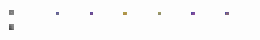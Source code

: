 \begin{figure}[h!]
	\setlength\tabcolsep{1pt}
	\def\arraystretch{0.5}
	\begin{tabular}{C{0.14\textwidth}C{0.14\textwidth}C{0.14\textwidth}C{0.14\textwidth}C{0.14\textwidth}C{0.14\textwidth}C{0.14\textwidth}}
		\includegraphics[width=0.14\textwidth]{images/p03/p03_01.png} &
		\includegraphics[width=0.14\textwidth]{images/gen/color_weight/p03_01.png_0.00.png} &
		\includegraphics[width=0.14\textwidth]{images/gen/color_weight/p03_01.png_0.33.png} &
		\includegraphics[width=0.14\textwidth]{images/gen/color_weight/p03_01.png_0.66.png} &
		\includegraphics[width=0.14\textwidth]{images/gen/color_weight/p03_01.png_1.00.png} &
		\includegraphics[width=0.14\textwidth]{images/gen/color_weight/p03_01.png_1.33.png} &
		\includegraphics[width=0.14\textwidth]{images/gen/color_weight/p03_01.png_1.66.png} \\
		\includegraphics[width=0.14\textwidth]{images/p03/p03_02.png} &

\end{tabular}
\end{figure}
